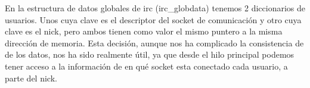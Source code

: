 \documentclass[nochap]{apuntes}
\begin{document}
En la estructura de datos globales de irc (irc_globdata) tenemos 2 diccionarios de usuarios. Unos cuya clave es el descriptor del socket de comunicación y otro cuya clave es el nick, pero ambos tienen como valor el mismo puntero a la misma dirección de memoria. Esta decisión, aunque nos ha complicado la consistencia de de los datos, nos ha sido realmente útil, ya que desde el hilo principal podemos tener acceso a la información de en qué socket esta conectado cada usuario, a parte del nick.
\end{document}
